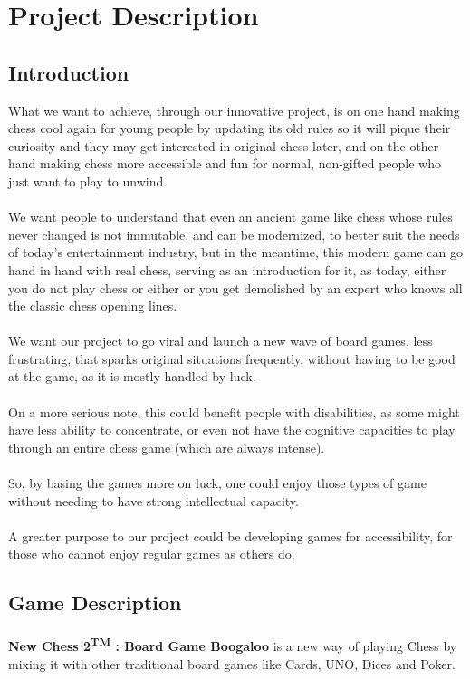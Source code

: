 \documentclass[12pt]{article}
\begin{document}
    \section{Project Description}
        \subsection{Introduction}
            What we want to achieve, through our innovative project, is on one hand making chess cool again for young people by updating its old rules so it will pique their curiosity and they may get interested in original chess later, and on the other hand making chess more accessible and fun for normal, non-gifted people who just want to play to unwind.
            \\\\We want people to understand that even an ancient game like chess whose rules never changed is not immutable, and can be modernized, to better suit the needs of today's entertainment industry, but in the meantime, this modern game can go hand in hand with real chess, serving as an introduction for it, as today, either you do not play chess or either or you get demolished by an expert who knows all the classic chess opening lines.
            \\\\We want our project to go viral and launch a new wave of board games, less frustrating, that sparks original situations frequently, without having to be good at the game, as it is mostly handled by luck.
            \\\\On a more serious note, this could benefit people with disabilities, as some might have less ability to concentrate, or even not have the cognitive capacities to play through an entire chess game (which are always intense).
            \\\\So, by basing the games more on luck, one could enjoy those types of game without needing to have strong intellectual capacity.
            \\\\A greater purpose to our project could be developing games for accessibility, for those who cannot enjoy regular games as others do.

        \subsection{Game Description}
            \paragraph{}
                \textbf{New Chess 2\textsuperscript{TM} : Board Game Boogaloo} is a new way of playing Chess by mixing it with other traditional board games like Cards, UNO, Dices and Poker.
\end{document}
